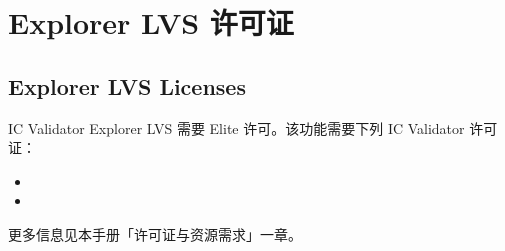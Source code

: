 \section{Explorer LVS 许可证}
\subsection*{Explorer LVS Licenses}

IC Validator Explorer LVS 需要 Elite 许可。该功能需要下列 IC Validator 许可证：
\begin{itemize}
  \item {}
  \item {}
\end{itemize}

\begin{seeAlsoBox}
更多信息见本手册「许可证与资源需求」一章。
\end{seeAlsoBox}
